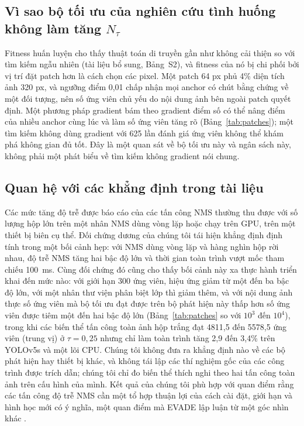 \documentclass[a4paper,fleqn]{cas-dc}
\newcommand{\Ntau}{N_{\tau}}
\begin{document}
\subsection{Vì sao bộ tối ưu của nghiên cứu tình huống không làm tăng $\Ntau$}
Fitness huấn luyện cho thấy thuật toán di truyền gần như không cải thiện so với tìm kiếm ngẫu nhiên (tài liệu bổ sung, Bảng~S2), và fitness của nó bị chi phối bởi vị trí đặt patch hơn là cách chọn các pixel. Một patch 64 px phủ 4\% diện tích ảnh 320 px, và ngưỡng điểm 0,01 chấp nhận mọi anchor có chút bằng chứng về một đối tượng, nên số ứng viên chủ yếu do nội dung ảnh bên ngoài patch quyết định. Một phương pháp gradient bám theo gradient điểm số có thể nâng điểm của nhiều anchor cùng lúc và làm số ứng viên tăng rõ (Bảng~\ref{tab:patches}); một tìm kiếm không dùng gradient với 625 lần đánh giá ứng viên không thể khám phá không gian đủ tốt. Đây là một quan sát về bộ tối ưu này và ngân sách này, không phải một phát biểu về tìm kiếm không gradient nói chung.

\subsection{Quan hệ với các khẳng định trong tài liệu}
Các mức tăng độ trễ được báo cáo của các tấn công NMS thường thu được với số lượng hộp lớn trên một nhân NMS dùng vòng lặp hoặc chạy trên GPU, trên một thiết bị biên cụ thể. Đối chứng dương của chúng tôi tái hiện khẳng định định tính trong một bối cảnh hẹp: với NMS dùng vòng lặp và hàng nghìn hộp rời nhau, độ trễ NMS tăng hai bậc độ lớn và thời gian toàn trình vượt mốc tham chiếu 100~ms. Cùng đối chứng đó cũng cho thấy bối cảnh này xa thực hành triển khai đến mức nào: với giới hạn 300 ứng viên, hiệu ứng giảm từ một đến ba bậc độ lớn, với một nhân thư viện phân biệt lớp thì giảm thêm, và với nội dung ảnh thực số ứng viên mà bộ tối ưu đạt được trên bộ phát hiện này thấp hơn số ứng viên được tiêm một đến hai bậc độ lớn (Bảng~\ref{tab:patches} so với $10^3$ đến $10^4$), trong khi các biến thể tấn công toàn ảnh hộp trắng đạt 4811,5 đến 5578,5 ứng viên (trung vị) ở $\tau=0{,}25$ nhưng chỉ làm toàn trình tăng 2,9 đến 3,4\% trên YOLOv5s và một lõi CPU. Chúng tôi không đưa ra khẳng định nào về các bộ phát hiện hay thiết bị khác, và không tái lập các thí nghiệm gốc của các công trình được trích dẫn; chúng tôi chỉ đo biến thể thích nghi theo hai tấn công toàn ảnh trên cấu hình của mình. Kết quả của chúng tôi phù hợp với quan điểm rằng các tấn công độ trễ NMS cần một tổ hợp thuận lợi của cách cài đặt, giới hạn và hình học mới có ý nghĩa, một quan điểm mà EVADE lập luận từ một góc nhìn khác \cite{evade2025}.
\end{document}
